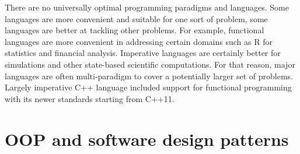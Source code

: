 \quad There are no universally optimal programming paradigms and languages. Some languages are more convenient and suitable for one sort of problem, some languages are better at tackling other problems. For example, functional languages are more convenient in addressing certain domains such as R for statistics and financial analysis. Imperative languages are certainly better for simulations and other state-based scientific computations. For that reason, major languages are often multi-paradigm to cover a potentially larger set of problems. Largely imperative C++ language included support for functional programming with its newer standards starting from C++11.\newline\null
\section{OOP and software design patterns}
\label{background_oop_design}
